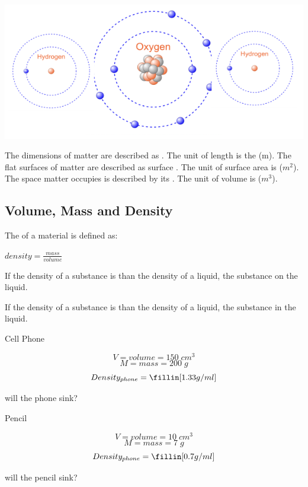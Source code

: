 \documentclass[answers,12pt]{exam}
\begin{document}
\includegraphics[width=1\textwidth]{water.png}

\begin{questions}
  

  \question The dimensions of matter are described as \fillin[length].
  \question The unit of length is the \fillin[meter] (m).
  \question The flat surfaces of matter are described as surface \fillin[area].
  \question The unit of surface area is  ($m^2$).
  \question The space matter occupies is described by its \fillin[volume].
  \question The unit of volume is  ($m^3$).

\end{questions}

\pagebreak

\subsection{Volume, Mass and Density}

\begin{questions}
  
  
  \question The \fillin[density] of a material is defined as:

  $density = \frac{mass}{volume}$
  
  \question If the density of a substance is \fillin[less] than the density of a liquid, the substance \fillin[float] on the liquid.
  
  \question If the density of a substance is \fillin[greater] than the density of a liquid, the substance \fillin[sink] in the liquid.


   Cell Phone 

  $$ V = volume = 150 \; cm^3 $$
  $$ M = mass = 200 \;g $$
  $$Density_{phone} = \fillin[1.33 g/ml] $$ 

  \question will the phone sink? \fillin[yes]

   Pencil 

  $$ V = volume = 10 \; cm^3 $$
  $$ M = mass = 7 \;g $$
  $$Density_{phone} = \fillin[0.7 g/ml] $$

  \question will the pencil sink? \fillin[no]
  
\end{questions}
\end{document}
